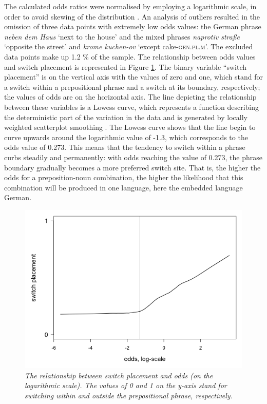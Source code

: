 The calculated odds ratios were normalised by employing a logarithmic scale, in order to avoid skewing of the distribution \citep[cf.][31]{baayen-analyzing}. An analysis of outliers \citep[cf.][258]{gries2009} resulted in the omission of three data points with extremely low odds values: the German phrase \textit{neben dem Haus} `next to the house' and the mixed phrases \textit{naprotiv straße} `opposite the street' and \textit{krome kuchen-ov} `except cake-\textsc{gen.pl.m}'. The excluded data points make up 1.2 \% of the sample. The relationship between odds values and switch placement is represented in Figure \ref{fig:5:2}. The binary variable “switch placement” is on the vertical axis with the values of zero and one, which stand for a switch within a prepositional phrase and a switch at its boundary, respectively; the values of odds are on the horizontal axis. The line depicting the relationship between these variables is a Lowess curve, which represents a function describing the deterministic part of the variation in the data and is generated by locally weighted scatterplot smoothing \citep{lowess}. The Lowess curve shows that the line begin to curve upwards around the logarithmic value of -1.3, which corresponds to the odds value of 0.273. This means that the tendency to switch within a phrase curbs steadily and permanently: with odds reaching the value of 0.273, the phrase boundary gradually becomes a more preferred switch site. That is, the higher the odds for a preposition-noun combination, the higher the likelihood that this combination will be produced in one language, here the embedded language German.

\begin{figure}
	\centering
	    	\includegraphics[scale=0.5]{figures/5-Figure_2.png}	
		\caption{\textit{The relationship between switch placement and odds (on the logarithmic scale). The values of 0 and 1 on the y-axis stand for switching within and outside the prepositional phrase, respectively.}}
	\label{fig:5:2}
\end{figure}

